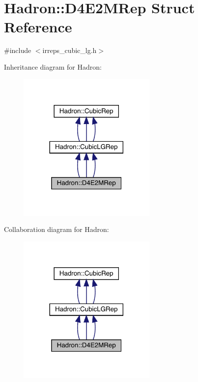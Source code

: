 \hypertarget{structHadron_1_1D4E2MRep}{}\section{Hadron\+:\+:D4\+E2\+M\+Rep Struct Reference}
\label{structHadron_1_1D4E2MRep}


{\ttfamily \#include $<$irreps\+\_\+cubic\+\_\+lg.\+h$>$}



Inheritance diagram for Hadron\+:
\nopagebreak
\begin{figure}[H]
\begin{center}
\leavevmode
\includegraphics[width=192pt]{de/dc6/structHadron_1_1D4E2MRep__inherit__graph}
\end{center}
\end{figure}


Collaboration diagram for Hadron\+:
\nopagebreak
\begin{figure}[H]
\begin{center}
\leavevmode
\includegraphics[width=192pt]{d8/d7c/structHadron_1_1D4E2MRep__coll__graph}
\end{center}
\end{figure}
